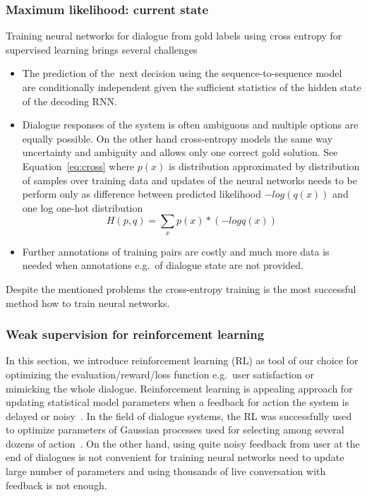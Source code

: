 \documentclass[11pt]{article}
\begin{document}
\subsubsection*{Maximum likelihood: current state}\label{sub:maximum_likelihood}
Training neural networks for dialogue from gold labels using cross entropy for supervised learning brings several challenges
\begin{itemize}
    \item The prediction of the~next decision using the sequence-to-sequence model~\cite{bahdanau_neural_2014,sutskever_sequence_2014} are conditionally independent given the sufficient statistics of the hidden state of the decoding RNN.
    \item Dialogue responses of the system is often ambiguous and multiple options are equally possible.
        On the other hand cross-entropy models the same way uncertainty and ambiguity and allows only one correct gold solution.
        See Equation~\ref{eq:cross} where $p(x)$ is distribution approximated by distribution of samples over training data and updates of the neural networks needs to be perform only as difference between predicted likelihood $-log(q(x))$ and one log one-hot distribution
        \begin{equation}\label{eq:cross}
            H(p, q) = \sum_{x}{p(x) * (- log q(x))}     
        \end{equation}
    \item Further annotations of training pairs are costly and much more data is needed when annotations e.g.\ of dialogue state are not provided.
\end{itemize}
Despite the mentioned problems the cross-entropy training is the most successful method how to train neural networks.

\subsubsection*{Weak supervision for reinforcement learning}\label{sub:batch_rl}

In this section, we introduce reinforcement learning (RL) as tool of our choice for optimizing the evaluation/reward/loss function e.g.\ user satisfaction or mimicking the whole dialogue.
Reinforcement learning is appealing approach for updating statistical model parameters when a feedback for action the system is delayed or noisy~\cite{williams2016end,bahdanau_actor-critic_2016,wierstra_recurrent_2010}.
In the field of dialogue systems, the RL was successfully used to optimize parameters of Gaussian processes used for selecting among several dozens of action~\cite{gasic2011line}.
On the other hand, using quite noisy feedback from user at the end of dialogues is not convenient for training neural networks need to update large number of parameters and using thousands of live conversation with feedback is not enough.
\end{document}
